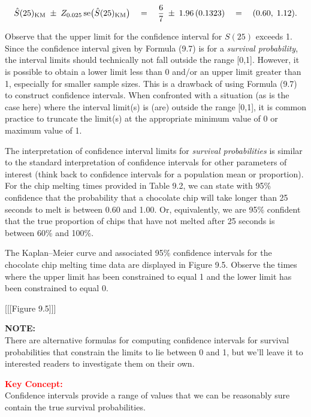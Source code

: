 \documentclass[
]{report}
\begin{document}
\begin{align}
\hat S(25)_{\mathrm{KM}} \;\pm\; Z_{0.025}\,\mathrm{se}\bigl(\hat S(25)_{\mathrm{KM}}\bigr)
\quad=\quad
\frac{6}{7}\;\pm\;1.96\,(0.1323)
\quad=\quad
(0.60,\;1.12).
\notag
\end{align}

Observe that the upper limit for the confidence interval for \(S(25)\) exceeds 1. Since the confidence interval given by Formula (9.7) is for a \emph{survival probability}, the interval limits should technically not fall outside the range {[}0,1{]}. However, it is possible to obtain a lower limit less than 0 and/or an upper limit greater than 1, especially for smaller sample sizes. This is a drawback of using Formula (9.7) to construct confidence intervals. When confronted with a situation (as is the case here) where the interval limit(s) is (are) outside the range {[}0,1{]}, it is common practice to truncate the limit(s) at the appropriate minimum value of 0 or maximum value of 1.

The interpretation of confidence interval limits for \emph{survival probabilities} is similar to the standard interpretation of confidence intervals for other parameters of interest (think back to confidence intervals for a population mean or proportion). For the chip melting times provided in Table 9.2, we can state with 95\% confidence that the probability that a chocolate chip will take longer than 25 seconds to melt is between 0.60 and 1.00. Or, equivalently, we are 95\% confident that the true proportion of chips that have not melted after 25 seconds is between 60\% and 100\%.

The Kaplan--Meier curve and associated 95\% confidence intervals for the chocolate chip melting time data are displayed in Figure 9.5. Observe the times where the upper limit has been constrained to equal 1 and the lower limit has been constrained to equal 0.

{[}{[}{[}Figure 9.5{]}{]}{]}

\large

\textbf{NOTE:}\\
There are alternative formulas for computing confidence intervals for survival probabilities that constrain the limits to lie between 0 and 1, but we'll leave it to interested readers to investigate them on their own.\\
\normalsize

\large

\textbf{\textcolor{red}{Key Concept:}}\\
\color{red}
Confidence intervals provide a range of values that we can be reasonably sure contain the true survival probabilities.\\
\color{black}
\normalsize
\end{document}
